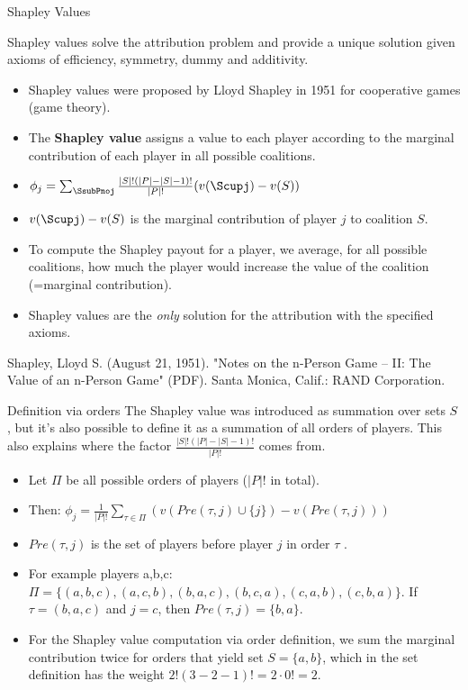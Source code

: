 \documentclass[10pt,compress,t,notes=noshow, xcolor=table]{beamer}
\begin{document}
\begin{vbframe}{Shapley Values}

  Shapley values solve the attribution problem and provide a unique solution given axioms of efficiency, symmetry, dummy and additivity.
\begin{itemize}
  \item Shapley values were proposed by Lloyd Shapley in 1951 for cooperative games (game theory).
  \item The \textbf{Shapley value} assigns a value to each player according to the marginal contribution of each player in all possible coalitions.
  \item $\phi_j = \sum_{\SsubPnoj} \frac{|S|!(|P| - |S| - 1)!}{|P|!}(v(\Scupj) - v(S))$
  \item $v(\Scupj) - v(S)$ is the marginal contribution of player $j$ to coalition $S$.
  \item To compute the Shapley payout for a player, we average, for all possible coalitions, how much the player would increase the value of the coalition (=marginal contribution).
  \item Shapley values are the \textit{only} solution for the attribution with the specified axioms.
\end{itemize}

\tiny{ Shapley, Lloyd S. (August 21, 1951). "Notes on the n-Person Game -- II: The Value of an n-Person Game" (PDF). Santa Monica, Calif.: RAND Corporation.}

\end{vbframe}

\begin{vbframe}{Definition via orders}
The Shapley value was introduced as summation over sets $S$, but it's also possible to define it as a summation of all orders of players.
This also explains where the factor $\frac{|S|!(|P| - |S| - 1)!}{|P|!}$ comes from.
\begin{itemize}
  \item Let $\Pi$ be all possible orders of players ($|P|!$ in total).
  \item Then: $\phi_j = \frac{1}{|P|!} \sum_{\tau \in \Pi} (v(Pre(\tau,j) \cup \{j\}) - v(Pre(\tau,j)))$
  \item $Pre(\tau,j)$ is the set of players before player $j$ in order $\tau$ .
  \item For example players a,b,c: $\Pi = \{(a,b,c), (a,c,b), (b,a,c), (b,c,a), (c,a,b), (c,b,a)\}$. If $\tau = (b,a,c)$ and $j=c$, then $Pre(\tau,j) = \{b, a\}$.
  \item For the Shapley value computation via order definition, we sum the marginal contribution twice for orders that yield set $S = \{a,b\}$, which in the set definition has the weight $2! (3 - 2 - 1)! = 2 \cdot 0! = 2$.
\end{itemize}
\end{vbframe}
\end{document}
